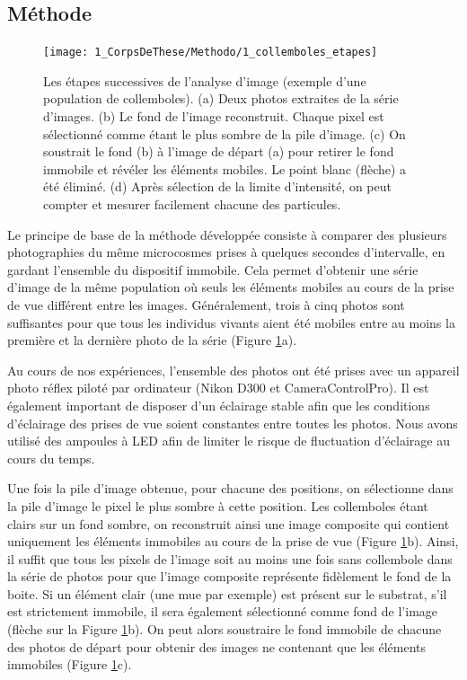 \subsection{Méthode}

\begin{figure}[!ht]
\begin{center}
\texttt{[image: 1\_CorpsDeThese/Methodo/1\_collemboles\_etapes]}
\caption[ Les étapes
de l'analyse d'image]{Les étapes successives de l'analyse d'image (exemple
d'une population de collemboles).
(a) Deux photos extraites de la série d'images. (b) Le fond de l'image
reconstruit. Chaque pixel est sélectionné comme étant le plus sombre de la
pile d'image. (c) On soustrait le fond (b) à l'image de départ (a) pour
retirer le fond immobile et révéler les éléments mobiles. Le point blanc
(flèche) a été éliminé. (d) Après sélection de la limite d'intensité, on
peut compter et mesurer facilement chacune des particules.}
\label{fig:photoetapes}
\end{center}
\end{figure}



Le principe de base de la méthode développée consiste à comparer des plusieurs
photographies du même microcosmes prises à quelques secondes d'intervalle, en
gardant l'ensemble du dispositif immobile. Cela permet d'obtenir une série
d'image de la même population où seuls les éléments mobiles au cours de la prise
de vue différent entre les images. Généralement, trois à cinq photos sont
suffisantes pour que tous les individus vivants aient été mobiles entre au
moins la première et la dernière photo de la série (Figure
\ref{fig:photoetapes}a).

Au cours de nos expériences, l'ensemble des photos ont été prises avec un
appareil photo réflex piloté par ordinateur (Nikon D300 et
CameraControlPro\textcopyright). Il est également important de disposer d'un
éclairage stable afin que les conditions d'éclairage des prises de vue soient
constantes entre toutes les photos. Nous avons utilisé des ampoules à LED afin
de limiter le risque de fluctuation d'éclairage au cours du temps. 

Une fois la pile d'image obtenue, pour chacune des positions, on sélectionne
dans la pile d'image le pixel le plus sombre à cette position. Les collemboles
étant clairs sur un fond sombre, on reconstruit ainsi une image composite qui
contient uniquement les éléments immobiles au cours de la prise de vue (Figure
\ref{fig:photoetapes}b).
Ainsi, il suffit que tous les pixels de l'image soit au moins une fois sans collembole
dans la série de photos pour que l'image composite représente fidèlement le fond
de la boite. Si un élément clair (une mue par exemple) est présent sur le
substrat, s'il est strictement immobile, il sera également sélectionné comme
fond de l'image (flèche sur la Figure \ref{fig:photoetapes}b). 
On peut alors soustraire le fond immobile de chacune des photos de départ pour
obtenir des images ne contenant que les éléments immobiles (Figure
\ref{fig:photoetapes}c). 

